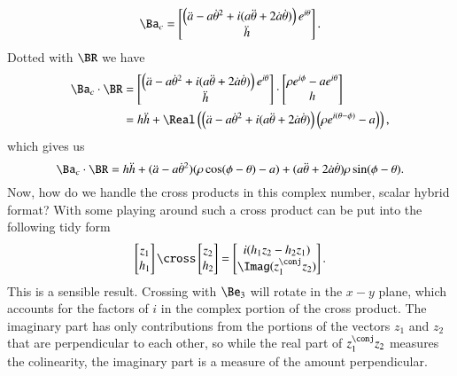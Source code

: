 {%
\begin{equation}\label{eqn:relativisticElectrodynamicsExamReflection:940}
\Ba_c =
\begin{bmatrix}
\left( \ddot{a} - a {\dot{\theta}}^2 + i ( a\ddot{\theta} + 2 \dot{a} \dot{\theta} ) \right) e^{i\theta} \\
\ddot{h}
\end{bmatrix}.
\end{equation}
%
Dotted with \(\BR\) we have
%
\begin{equation}\label{eqn:relativisticElectrodynamicsExamReflection:1290}
\begin{aligned}
\Ba_c \cdot \BR
&=
\begin{bmatrix}
\left( \ddot{a} - a {\dot{\theta}}^2 + i ( a\ddot{\theta} + 2 \dot{a} \dot{\theta} ) \right) e^{i\theta} \\
\ddot{h}
\end{bmatrix}
\cdot
\begin{bmatrix}
\rho e^{i\phi} - a e^{i\theta} \\
h
\end{bmatrix} \\
&=
h \ddot{h} + \Real\left(
\left( \ddot{a} - a {\dot{\theta}}^2 + i ( a\ddot{\theta} + 2 \dot{a} \dot{\theta} ) \right) \left(\rho e^{i(\theta- \phi)} - a\right)
\right) ,
\end{aligned}
\end{equation}
%
which gives us
%
\begin{equation}\label{eqn:relativisticElectrodynamicsExamReflection:950}
\Ba_c \cdot \BR =
h \ddot{h} +
( \ddot{a} - a {\dot{\theta}}^2 ) (\rho \cos(\phi - \theta) - a)
+ (a \ddot{\theta} + 2 \dot{a} \dot{\theta}) \rho \sin(\phi - \theta).
\end{equation}
%
Now, how do we handle the cross products in this complex number, scalar hybrid format?  With some playing around such a cross product can be put into the following tidy form
%
\begin{equation}\label{eqn:relativisticElectrodynamicsExamReflection:960}
\begin{bmatrix}
z_1 \\
h_1
\end{bmatrix}
\cross
\begin{bmatrix}
z_2 \\
h_2
\end{bmatrix}
=
\begin{bmatrix}
i (h_1 z_2 - h_2 z_1) \\
\Imag(z_1^\conj z_2)
\end{bmatrix}.
\end{equation}
%
This is a sensible result.  Crossing with \(\Be_3\) will rotate in the \(x-y\) plane, which accounts for the factors of \(i\) in the complex portion of the cross product.  The imaginary part has only contributions from the portions of the vectors \(z_1\) and \(z_2\) that are perpendicular to each other, so while the real part of \(z_1^\conj z_2\) measures the colinearity, the imaginary part is a measure of the amount perpendicular.

}
